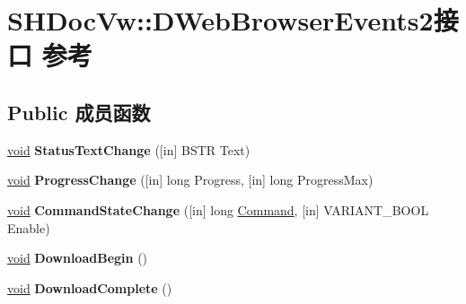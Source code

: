 \hypertarget{interface_s_h_doc_vw_1_1_d_web_browser_events2}{}\section{S\+H\+Doc\+Vw\+:\+:D\+Web\+Browser\+Events2接口 参考}
\label{interface_s_h_doc_vw_1_1_d_web_browser_events2}
\subsection*{Public 成员函数}
\begin{DoxyCompactItemize}
\item 
\mbox{\label{interface_s_h_doc_vw_1_1_d_web_browser_events2_a0cc905af8a0ce2b104fc05097b5dd918}} 
\hyperlink{interfacevoid}{void} {\bfseries Status\+Text\+Change} (\mbox{[}in\mbox{]} B\+S\+TR Text)
\item 
\mbox{\label{interface_s_h_doc_vw_1_1_d_web_browser_events2_ae950402171fac29b78e3120bd9fd5741}} 
\hyperlink{interfacevoid}{void} {\bfseries Progress\+Change} (\mbox{[}in\mbox{]} long Progress, \mbox{[}in\mbox{]} long Progress\+Max)
\item 
\mbox{\label{interface_s_h_doc_vw_1_1_d_web_browser_events2_aeaf5b260c5af52e908889defa3191e58}} 
\hyperlink{interfacevoid}{void} {\bfseries Command\+State\+Change} (\mbox{[}in\mbox{]} long \hyperlink{struct_command}{Command}, \mbox{[}in\mbox{]} V\+A\+R\+I\+A\+N\+T\+\_\+\+B\+O\+OL Enable)
\item 
\mbox{\label{interface_s_h_doc_vw_1_1_d_web_browser_events2_a3587fbf704bc71b435210643438e2e98}} 
\hyperlink{interfacevoid}{void} {\bfseries Download\+Begin} ()
\item 
\mbox{\label{interface_s_h_doc_vw_1_1_d_web_browser_events2_abaf80f3782beb7dc19a94a8c6691d4e5}} 
\hyperlink{interfacevoid}{void} {\bfseries Download\+Complete} ()
\item 
\mbox{\label{interface_s_h_doc_vw_1_1_d_web_browser_events2_af7304a4f3f8bf12453049e0fb59877fb}} 

\end{DoxyCompactItemize}

